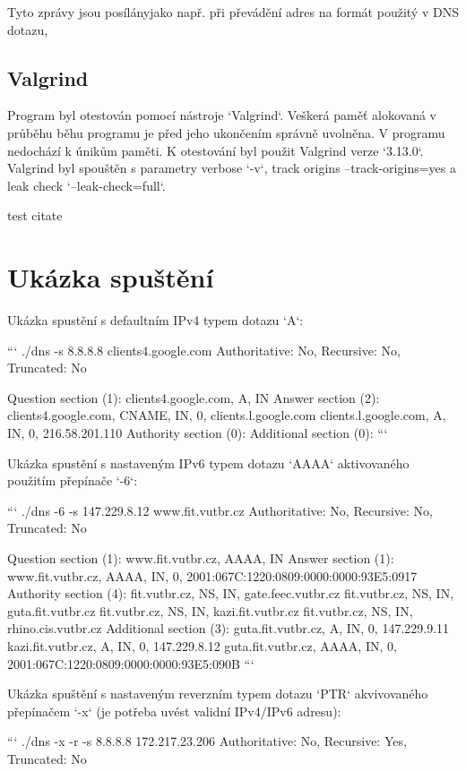 \documentclass[a4paper,11pt]{article}
\begin{document}
Tyto zprávy jsou posílányjako např. při převádění adres na formát použitý v DNS dotazu, 

\subsection{Valgrind}

Program byl otestován pomocí nástroje `Valgrind`. Veškerá paměť alokovaná v průběhu běhu programu je před jeho ukončením správně uvolněna. V programu nedochází k únikům paměti. K otestování byl použit Valgrind verze `3.13.0`. Valgrind byl spouštěn s parametry verbose `-v`, track origins --track-origins=yes a leak check `--leak-check=full`.

test citate \cite{test_citate}

\section{Ukázka spuštění}

Ukázka spustění s defaultním IPv4 typem dotazu `A`:

```
./dns -s 8.8.8.8 clients4.google.com
Authoritative: No, Recursive: No, Truncated: No

Question section (1):
  clients4.google.com, A, IN
Answer section (2):
  clients4.google.com, CNAME, IN, 0, clients.l.google.com
  clients.l.google.com, A, IN, 0, 216.58.201.110
Authority section (0):
Additional section (0):
```

Ukázka spustění s nastaveným IPv6 typem dotazu `AAAA` aktivovaného použitím přepínače `-6`:

```
./dns -6 -s 147.229.8.12 www.fit.vutbr.cz
Authoritative: No, Recursive: No, Truncated: No

Question section (1):
  www.fit.vutbr.cz, AAAA, IN
Answer section (1):
  www.fit.vutbr.cz, AAAA, IN, 0, 2001:067C:1220:0809:0000:0000:93E5:0917
Authority section (4):
  fit.vutbr.cz, NS, IN, gate.feec.vutbr.cz
  fit.vutbr.cz, NS, IN, guta.fit.vutbr.cz
  fit.vutbr.cz, NS, IN, kazi.fit.vutbr.cz
  fit.vutbr.cz, NS, IN, rhino.cis.vutbr.cz
Additional section (3):
  guta.fit.vutbr.cz, A, IN, 0, 147.229.9.11
  kazi.fit.vutbr.cz, A, IN, 0, 147.229.8.12
  guta.fit.vutbr.cz, AAAA, IN, 0, 2001:067C:1220:0809:0000:0000:93E5:090B
```

Ukázka spuštění s nastaveným reverzním typem dotazu `PTR` akvivovaného přepínačem `-x` (je potřeba uvést validní IPv4/IPv6 adresu):

```
./dns -x -r -s 8.8.8.8 172.217.23.206
Authoritative: No, Recursive: Yes, Truncated: No
\end{document}
